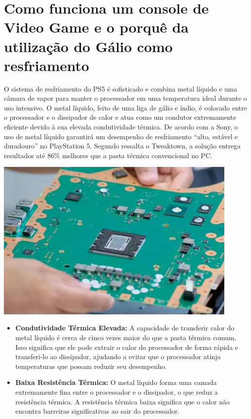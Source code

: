 \documentclass{article}
\begin{document}
\section{Como funciona um console de Video Game e o porquê da utilização do Gálio como resfriamento}
O sistema de resfriamento do PS5 é sofisticado e combina metal líquido e uma câmara de vapor para manter o processador em uma temperatura ideal durante o uso intensivo. O metal líquido, feito de uma liga de gálio e índio, é colocado entre o processador e o dissipador de calor e atua como um condutor extremamente eficiente devido à sua elevada condutividade térmica.
De acordo com a Sony, o uso de metal líquido garantirá um desempenho de resfriamento “alto, estável e duradouro” no PlayStation 5. Segundo ressalta o Tweaktown, a solução entrega resultados até 86\% melhores que a pasta térmica convencional no PC.
\begin{adjustbox}{center,caption={O metal líquido garante melhor desempenho em comparação à pasta térmica. (Imagem: PlayStation/Reprodução)},nofloat=figure,vspace=\bigskipamount}
    \centering
    \includegraphics[width=12cm]{mobo.png}
\end{adjustbox}
\begin{itemize}
    \item \textbf{Condutividade Térmica Elevada:} A capacidade de transferir calor do metal líquido é cerca de cinco vezes maior do que a pasta térmica comum. Isso significa que ele pode extrair o calor do processador de forma rápida e transferi-lo ao dissipador, ajudando a evitar que o processador atinja temperaturas que possam reduzir seu desempenho.
    \item \textbf{Baixa Resistência Térmica:} O metal líquido forma uma camada extremamente fina entre o processador e o dissipador, o que reduz a resistência térmica. A resistência térmica baixa significa que o calor não encontra barreiras significativas ao sair do processador.
\end{itemize}
\end{document}
